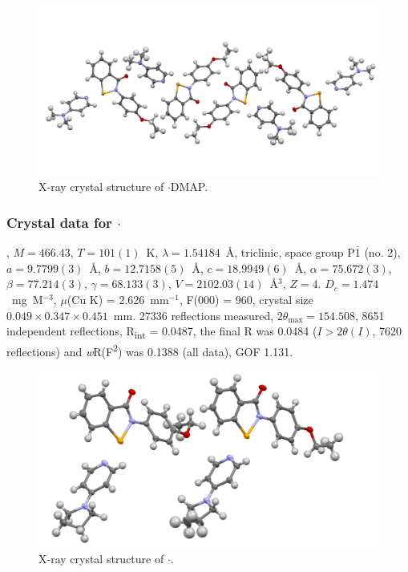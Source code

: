 \begin{refsection}
\begin{figure}
  \includegraphics[width=0.6\linewidth]{Figures/ebs-4oet-dmap-xtal.pdf}
  \caption{X-ray crystal structure of \texorpdfstring{$ \cdot $DMAP}{C22 H23 N3 O2 Se}.}
\end{figure}

\subsubsection{Crystal data for \texorpdfstring{$ \cdot $}{C24 H25 N3 O2 Se}}
, $M=466.43$, $T=101(1)$~K, $\lambda=1.54184$~\AA, triclinic, space group P$\bar{1}$ (no. 2), $a = 9.7799(3)$~\AA, $b = 12.7158(5)$~\AA, $c = 18.9949(6)$~\AA, $\alpha = 75.672(3)$\degree, $\beta = 77.214(3)$\degree, $\gamma = 68.133(3)$\degree, $V = 2102.03(14)$~\AA$^{3}$, $Z = 4$. $D_{c}= 1.474$~mg~M$^{-3}$, $\mu$(Cu K\a) = 2.626~mm$^{-1}$, F(000) = 960, crystal size $0.049 \times 0.347 \times 0.451$~mm. 27336 reflections measured, $2\theta_{\max}=154.508$\degree, 8651 independent reflections, R\textsubscript{int} = 0.0487, the final R was 0.0484 ($I > 2\theta(I)$, 7620 reflections) and \textit{w}R(F\textsuperscript{2}) was 0.1388 (all data), GOF 1.131.

\begin{figure}
  \includegraphics[width=0.6\linewidth]{Figures/ebs-4oet-pyrrol-xtal.pdf}
  \caption{X-ray crystal structure of \texorpdfstring{$ \cdot $}{C24 H25 N3 O2 Se}.}
\end{figure}


\end{refsection}
